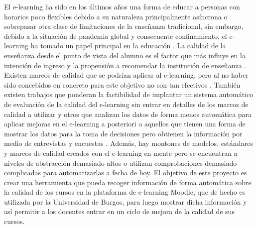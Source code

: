 
El e-learning ha sido en los últimos años una forma de educar a personas con horarios poco flexibles debido a su naturaleza principalmente asíncrona o sobrepasar otra clase de limitaciones de la enseñanza tradicional, sin embargo, debido a la situación de pandemia global y consecuente confinamiento, el e-learning ha tomado un papel principal en la educación \cite{muhammad2020hierarchical}.
La calidad de la enseñanza desde el punto de vista del alumno es el factor que más influye en la intención de ingreso y la propensión a recomendar la institución de enseñanza \cite{martinez2016perceived}.
Existen marcos de calidad que se podrían aplicar al e-learning, pero al no haber sido concebidos en concreto para este objetivo no son tan efectivos \cite{muhammad2020hierarchical}.
También existen trabajos que ponderan la factibilidad de implantar un sistema automático de evaluación de la calidad del e-learning sin entrar en detalles de los marcos de calidad a utilizar \cite{doneva2015automated} y otros que analizan los datos de forma menos automática para aplicar mejoras en el e-learning a posteriori \cite{ueda2017data} o aquellos que tienen una forma de mostrar los datos para la toma de decisiones pero obtienen la información por medio de entrevistas y encuestas \cite{mejia2020dashboard}.
Además, hay montones de modelos, estándares y marcos de calidad creados con el e-learning en mente pero se encuentran a niveles de abstracción demasiado altos o utilizan comprobaciones demasiado complicadas para automatizarlas a fecha de hoy.
El objetivo de este proyecto es crear una herramienta que pueda recoger información de forma automática sobre la calidad de los cursos en la plataforma de e-learning Moodle, que de hecho es utilizada por la Universidad de Burgos, para luego mostrar dicha información y así permitir a los docentes entrar en un ciclo de mejora de la calidad de sus cursos.
